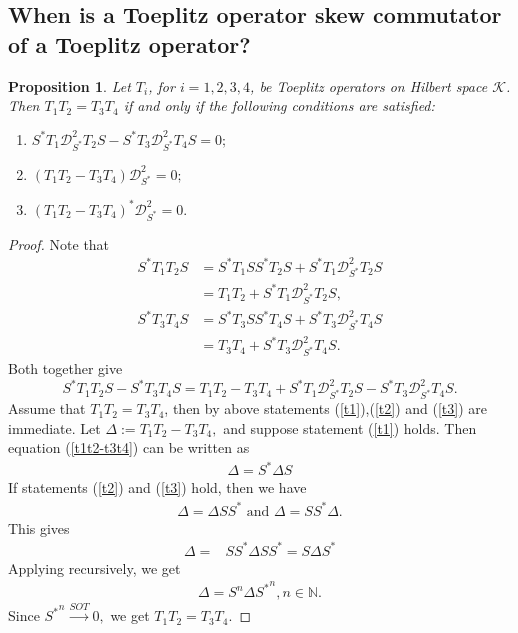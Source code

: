\documentclass[12pt, reqno]{amsart}
\newtheorem{proposition}[theorem]{Proposition}
\theoremstyle{definition}
\theoremstyle{remark}
\numberwithin{equation}{section}
\newcommand{\ck}{\mathcal{K}}
\begin{document}
    \subsection{When is a Toeplitz operator skew commutator of a Toeplitz operator?}
    \begin{proposition}
        Let $T_i$, for $i=1,2,3,4$, be Toeplitz operators on Hilbert space $\ck$. Then $T_1T_2=T_3T_4$ if and only if the following conditions are satisfied:
        \begin{enumerate}
            \item $S^*T_1\mathcal{D}^2_{S^*}T_2S-S^*T_3\mathcal{D}^2_{S^*}T_4S=0;$
            \item $(T_1T_2-T_3T_4)\mathcal{D}^2_{S^*}=0;$
            \item $(T_1T_2-T_3T_4)^*\mathcal{D}^2_{S^*}=0.$
        \end{enumerate}
    \end{proposition}
        \begin{proof}
            Note that
            \begin{align*}
                S^*T_1T_2S&=S^*T_1SS^*T_2S+S^*T_1\mathcal{D}^2_{S^*}T_2S\\
                &=T_1T_2+S^*T_1\mathcal{D}^2_{S^*}T_2S,\\
                S^*T_3T_4S&=S^*T_3SS^*T_4S+S^*T_3\mathcal{D}^2_{S^*}T_4S\\
                &=T_3T_4+S^*T_3\mathcal{D}^2_{S^*}T_4S.
            \end{align*}
            Both together give
            \begin{equation}\label{t1t2-t3t4}
                S^*T_1T_2S-S^*T_3T_4S=T_1T_2-T_3T_4+S^*T_1\mathcal{D}^2_{S^*}T_2S-S^*T_3\mathcal{D}^2_{S^*}T_4S.
            \end{equation}
            Assume that $T_1T_2=T_3T_4$, then by above statements (\ref{t1}),(\ref{t2}) and (\ref{t3}) are immediate. 
            Let $\Delta:=T_1T_2-T_3T_4,$ and suppose statement (\ref{t1}) holds. Then equation (\ref{t1t2-t3t4}) can be written as 
            \begin{align*}
                \Delta=S^*\Delta S
            \end{align*}
            If statements (\ref{t2}) and (\ref{t3}) hold, then we have
            \begin{align*}
                \Delta =\Delta SS^* \text{ and }\Delta =SS^* \Delta.
            \end{align*}
            This gives
            \begin{align*}
            \Delta=&SS^*\Delta SS^*=S\Delta S^*
            \end{align*}
        Applying recursively, we get
        \begin{align*}
            \Delta=S^n\Delta {S^*}^n, n \in \mathbb{N}.
        \end{align*}
        Since ${S^*}^n \xrightarrow{SOT} 0,$ we get $T_1T_2=T_3T_4.$
        \end{proof}
\end{document}
